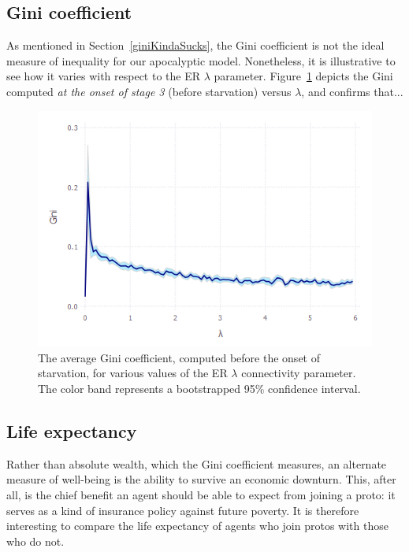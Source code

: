 
\subsection{Gini coefficient}

As mentioned in Section~\ref{giniKindaSucks}, the Gini coefficient is not the
ideal measure of inequality for our apocalyptic model. Nonetheless, it is
illustrative to see how it varies with respect to the ER $\lambda$ parameter.
Figure~\ref{fig:giniVsLambda} depicts the Gini computed \textit{at the onset
of stage 3} (before starvation) versus $\lambda$, and confirms that...

\begin{figure}[hb]
\centering
\includegraphics[width=\columnwidth]{figures/giniVsLambda.png}
\caption{The average Gini coefficient, computed before the onset of starvation,
for various values of the ER $\lambda$ connectivity parameter. The color band
represents a bootstrapped 95\% confidence interval.}
\label{fig:giniVsLambda}
\end{figure}


\subsection{Life expectancy}

Rather than absolute wealth, which the Gini coefficient measures, an alternate
measure of well-being is the ability to survive an economic downturn. This,
after all, is the chief benefit an agent should be able to expect from joining
a proto: it serves as a kind of insurance policy against future poverty. It is
therefore interesting to compare the life expectancy of agents who join protos
with those who do not.

